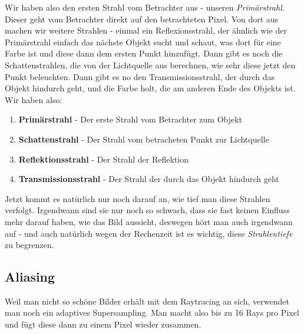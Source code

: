 Wir haben also den ersten Strahl vom Betrachter aus - unseren \textit{Primärstrahl}. Dieser geht vom Betrachter direkt auf den betrachteten Pixel. Von dort aus machen wir weitere Strahlen - einmal ein Reflexionsstrahl, der ähnlich wie der Primärstrahl einfach das nächste Objekt sucht und schaut, was dort für eine Farbe ist und diese dann dem ersten Punkt hinzufügt. Dann gibt es noch die Schattenstrahlen, die von der Lichtquelle aus berechnen, wie sehr diese jetzt den Punkt beleuchten. Dann gibt es no den Transmissionsstrahl, der durch das Objekt hindurch geht, und die Farbe holt, die am anderen Ende des Objekts ist. Wir haben also:
\begin{enumerate}
	\item \textbf{Primärstrahl} - Der erste Strahl vom Betrachter zum Objekt
	\item \textbf{Schattenstrahl} - Der Strahl vom betracheten Punkt zur Lichtquelle
	\item \textbf{Reflektionsstrahl} - Der Strahl der Reflektion
	\item \textbf{Transmissionsstrahl} - Der Strahl der durch das Objekt hindurch geht
\end{enumerate}

Jetzt kommt es natürlich nur noch darauf an, wie tief man diese Strahlen verfolgt. Irgendwann sind sie nur noch so schwach, dass sie fast keinen Einfluss mehr darauf haben, wie das Bild aussieht, deswegen hört man auch irgendwann auf - und auch natürlich wegen der Rechenzeit ist es wichtig, diese \textit{Strahlentiefe} zu begrenzen.

\subsection{Aliasing}
Weil man nicht so schöne Bilder erhält mit dem Raytracing an sich, verwendet man noch ein adaptives Supersampling. Man macht also bis zu 16 Rays pro Pixel und fügt diese dann zu einem Pixel wieder zusammen.